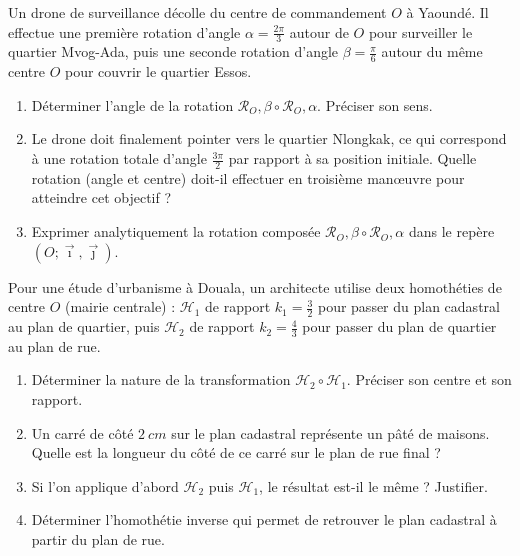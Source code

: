 \documentclass[11pt]{article}
\begin{document}
\begin{exercice}
Un drone de surveillance décolle du centre de commandement $O$ à Yaoundé. Il effectue une première rotation d'angle $\alpha = \frac{2\pi}{3}$ autour de $O$ pour surveiller le quartier Mvog-Ada, puis une seconde rotation d'angle $\beta = \frac{\pi}{6}$ autour du même centre $O$ pour couvrir le quartier Essos.
\begin{enumerate}
    \item Déterminer l'angle de la rotation $\mathcal{R}_O,\beta \circ \mathcal{R}_O,\alpha$. Préciser son sens.
    \item Le drone doit finalement pointer vers le quartier Nlongkak, ce qui correspond à une rotation totale d'angle $\frac{3\pi}{2}$ par rapport à sa position initiale. Quelle rotation (angle et centre) doit-il effectuer en troisième manœuvre pour atteindre cet objectif ?
    \item Exprimer analytiquement la rotation composée $\mathcal{R}_O,\beta \circ \mathcal{R}_O,\alpha$ dans le repère $(O; \vec{\imath}, \vec{\jmath})$.
\end{enumerate}
\end{exercice}

\begin{exercice}
Pour une étude d'urbanisme à Douala, un architecte utilise deux homothéties de centre $O$ (mairie centrale) : $\mathcal{H}_1$ de rapport $k_1 = \frac{3}{2}$ pour passer du plan cadastral au plan de quartier, puis $\mathcal{H}_2$ de rapport $k_2 = \frac{4}{3}$ pour passer du plan de quartier au plan de rue.
\begin{enumerate}
    \item Déterminer la nature de la transformation $\mathcal{H}_2 \circ \mathcal{H}_1$. Préciser son centre et son rapport.
    \item Un carré de côté $\SI{2}{cm}$ sur le plan cadastral représente un pâté de maisons. Quelle est la longueur du côté de ce carré sur le plan de rue final ?
    \item Si l'on applique d'abord $\mathcal{H}_2$ puis $\mathcal{H}_1$, le résultat est-il le même ? Justifier.
    \item Déterminer l'homothétie inverse qui permet de retrouver le plan cadastral à partir du plan de rue.
\end{enumerate}
\end{exercice}
\end{document}
